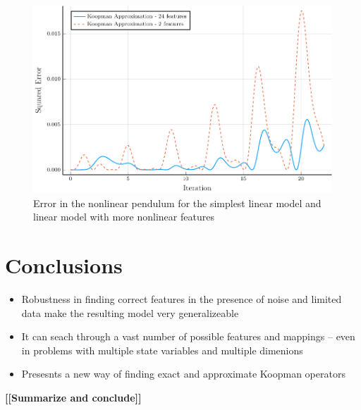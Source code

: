 \documentclass{article}
\newcommand{\todo}[1]{\textbf{[[#1]]}}
\begin{document}
\begin{figure}
\vskip 0.2in
\begin{center}
\centerline{\includegraphics[width=\columnwidth]{./figures/pendulum}}
\caption{Error in the nonlinear pendulum for the simplest linear model and linear model with more nonlinear features}
\label{fig:pendulum}
\end{center}
\vskip -0.2in
\end{figure}

\section{Conclusions}
\label{conclusion}

\begin{itemize}
    \item Robustness in finding correct features in the presence of noise and limited data make the resulting model very generalizeable
    \item It can seach through a vast number of possible features and mappings -- even in problems with multiple state variables and multiple dimenions
    \item Presesnts a new way of finding exact and approximate Koopman operators
\end{itemize}

\todo{Summarize and conclude}





% 

\end{document}
